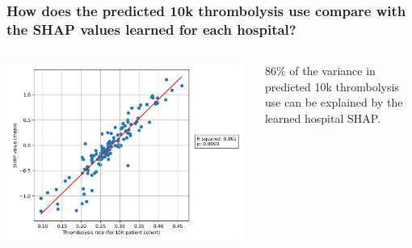 \documentclass[xcolor={usenames,dvipsnames}]{beamer}
\begin{document}
\begin{frame}
\frametitle{How does the predicted 10k thrombolysis use compare with the SHAP values learned for each hospital?}

\begin{columns}
    \begin{center} 
    \includegraphics[width=0.98\textwidth]{./images/rsquared_shap_predicted_thrombolysis}
    \end{center} 
    
    
    {\footnotesize
    86\% of the variance in predicted
    10k thrombolysis use can be
    explained by the learned hospital
    SHAP.}
\end{columns}


\end{frame}



\end{document}
